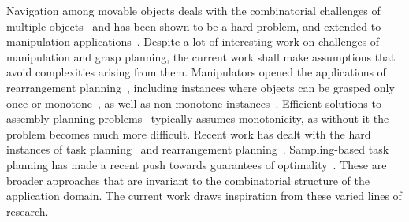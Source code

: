 Navigation among movable objects deals with the combinatorial challenges of multiple objects~\cite{wilfong1991motion,van2009path} and has been shown to be a hard problem, and extended to manipulation applications~\cite{stilman2007manipulation}. Despite a lot of interesting work on challenges of manipulation and grasp planning, the current work shall make assumptions that avoid complexities arising from them. Manipulators opened the applications of rearrangement planning~\cite{ben1998practical,ota2004rearrangement}, including instances where objects can be grasped only once or monotone~\cite{stilman2007manipulation}, as well as non-monotone instances~\cite{havur2014geometric,srivastava2014combined}. Efficient solutions to assembly planning problems~\cite{Wilson:1994fk,Halperin:2000uq} typically assumes monotonicity, as without it the problem becomes much more difficult. Recent work has dealt with the hard instances of task planning~\cite{berenson2011task,cohen2014single} and rearrangement planning~\cite{krontiris2015dealing,krontiris2016efficiently,193}. Sampling-based task planning has made a recent push towards guarantees of optimality~\cite{vega2016asymptotically,schmitt2017optimal}. These are broader approaches that are invariant to the combinatorial structure of the application domain. The current work draws inspiration from these varied lines of research.

